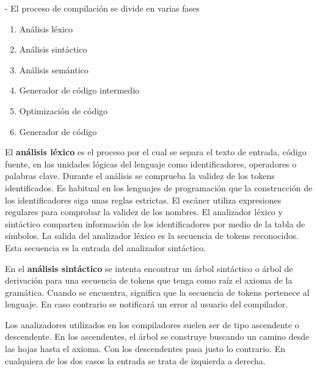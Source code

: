 - El proceso de compilación se divide en varias fases

\begin{enumerate}
    \item Análisis léxico
    \item Análisis sintáctico
    \item Análisis semántico
    \item Generador de código intermedio
    \item Optimización de código
    \item Generador de código
\end{enumerate}

El \textbf{análisis léxico} es el proceso por el cual se separa el texto de entrada, código fuente, en las unidades lógicas del lenguaje como identificadores, operadores o palabras clave. 
Durante el análisis se comprueba la validez de los tokens identificados. Es habitual en los lenguajes de programación que la construcción de los identificadores siga unas reglas estrictas. El escáner utiliza expresiones regulares para comprobar la validez de los nombres.
El analizador léxico y sintáctico comparten información de los identificadores por medio de la tabla de símbolos.
La salida del analizador léxico es la secuencia de tokens reconocidos. Esta secuencia es la entrada del analizador sintáctico.


En el \textbf{análisis sintáctico} se intenta encontrar un árbol sintáctico o árbol de derivación para una secuencia de tokens que tenga como raíz el axioma de la gramática. Cuando se encuentra, significa que la secuencia de tokens pertenece al lenguaje. En caso contrario se notificará un error al usuario del compilador.

Los analizadores utilizados en los compiladores suelen ser de tipo ascendente o descendente. En los ascendentes, el árbol se construye buscando un camino desde las hojas hasta el axioma. Con los descendentes pasa justo lo contrario. En cualquiera de los dos casos la entrada se trata de izquierda a derecha.


